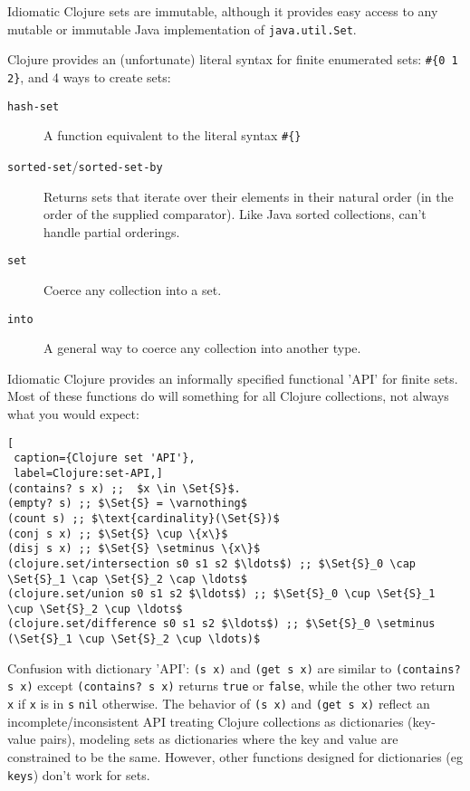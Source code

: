 Idiomatic Clojure sets are immutable, although it provides easy
access to any mutable or immutable Java implementation of
\lstinline|java.util.Set|.

Clojure provides an (unfortunate) literal syntax for finite
enumerated sets: 
\lstinline|#{0 1 2}|, and 4 ways to create sets:
\begin{description}
\item[\texttt{hash-set}] A function equivalent to the
literal syntax \lstinline|#{}|
\item[\texttt{sorted-set}/\texttt{sorted-set-by}] Returns
sets that iterate over their elements in their natural order (in the
order of the supplied comparator). Like Java sorted collections,
can't handle partial orderings.
\item[\texttt{set}] Coerce any collection into a set.
\item[\texttt{into}] A general way to coerce any collection
into another type.
\end{description}

Idiomatic Clojure provides an informally specified functional
'API' for finite sets. Most of these functions do will something
for all Clojure collections, not always what you would expect:
\begin{lstlisting}[
 caption={Clojure set 'API'}, 
 label=Clojure:set-API,]
(contains? s x) ;;  $x \in \Set{S}$.
(empty? s) ;; $\Set{S} = \varnothing$
(count s) ;; $\text{cardinality}(\Set{S})$
(conj s x) ;; $\Set{S} \cup \{x\}$
(disj s x) ;; $\Set{S} \setminus \{x\}$
(clojure.set/intersection s0 s1 s2 $\ldots$) ;; $\Set{S}_0 \cap \Set{S}_1 \cap \Set{S}_2 \cap \ldots$ 
(clojure.set/union s0 s1 s2 $\ldots$) ;; $\Set{S}_0 \cup \Set{S}_1 \cup \Set{S}_2 \cup \ldots$ 
(clojure.set/difference s0 s1 s2 $\ldots$) ;; $\Set{S}_0 \setminus (\Set{S}_1 \cup \Set{S}_2 \cup \ldots)$
\end{lstlisting}

Confusion with dictionary 'API':
 \lstinline|(s x)| and \lstinline|(get s x)| are similar to
 \lstinline|(contains? s x)| except \lstinline|(contains? s x)| returns
 \lstinline|true| or \lstinline|false|, while the other two return
 \lstinline|x| if \lstinline|x| is in \lstinline|s| \lstinline|nil| otherwise.
The behavior of \lstinline|(s x)| and \lstinline|(get s x)| reflect an
incomplete/inconsistent API treating Clojure collections as
dictionaries (key-value pairs), modeling sets as dictionaries
where the key and value are constrained to be the same.
However, other functions designed for dictionaries (eg
\lstinline|keys|) don't work for sets.
 
